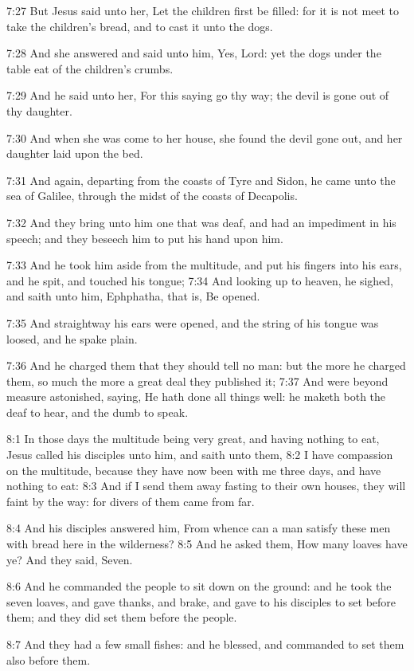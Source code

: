 7:27 But Jesus said unto her, Let the children first be filled: for it
is not meet to take the children's bread, and to cast it unto the
dogs.

7:28 And she answered and said unto him, Yes, Lord: yet the dogs under
the table eat of the children's crumbs.

7:29 And he said unto her, For this saying go thy way; the devil is
gone out of thy daughter.

7:30 And when she was come to her house, she found the devil gone out,
and her daughter laid upon the bed.

7:31 And again, departing from the coasts of Tyre and Sidon, he came
unto the sea of Galilee, through the midst of the coasts of Decapolis.

7:32 And they bring unto him one that was deaf, and had an impediment
in his speech; and they beseech him to put his hand upon him.

7:33 And he took him aside from the multitude, and put his fingers
into his ears, and he spit, and touched his tongue; 7:34 And looking
up to heaven, he sighed, and saith unto him, Ephphatha, that is, Be
opened.

7:35 And straightway his ears were opened, and the string of his
tongue was loosed, and he spake plain.

7:36 And he charged them that they should tell no man: but the more he
charged them, so much the more a great deal they published it; 7:37
And were beyond measure astonished, saying, He hath done all things
well: he maketh both the deaf to hear, and the dumb to speak.

8:1 In those days the multitude being very great, and having nothing
to eat, Jesus called his disciples unto him, and saith unto them, 8:2
I have compassion on the multitude, because they have now been with me
three days, and have nothing to eat: 8:3 And if I send them away
fasting to their own houses, they will faint by the way: for divers of
them came from far.

8:4 And his disciples answered him, From whence can a man satisfy
these men with bread here in the wilderness?  8:5 And he asked them,
How many loaves have ye? And they said, Seven.

8:6 And he commanded the people to sit down on the ground: and he took
the seven loaves, and gave thanks, and brake, and gave to his
disciples to set before them; and they did set them before the people.

8:7 And they had a few small fishes: and he blessed, and commanded to
set them also before them.

